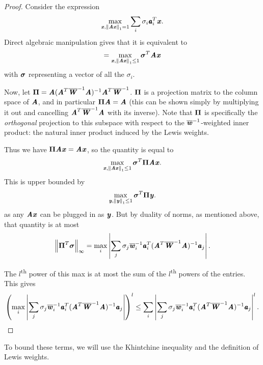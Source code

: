 \begin{proof}

Consider the expression
\begin{equation*}
\max_{\xx, \norm{\AA \xx}_1 = 1 } \sum_i \sigma_i \aa_i^T \xx.
\end{equation*}
Direct algebraic manipulation gives that it is equivalent to
\begin{equation*}
= \max_{\xx, \norm{ \AA \xx}_1 \leq 1} \ssigma^T \AA \xx
\end{equation*}
with $\ssigma$ representing a vector of all the $\sigma_i$.

Now, let $\PPi = \AA ( \AA^T \WWbar^{-1} \AA )^{-1} \AA^T \WWbar^{-1}$.  $\PPi$ is a projection matrix to
the column space of $\AA$, and in particular $\PPi \AA = \AA$ (this can be shown simply by
multiplying it out and cancelling $\AA^T \WWbar^{-1} \AA$ with its inverse).  Note that $\PPi$ is
specifically the \emph{orthogonal} projection to this subspace with respect to the
$\wwbar^{-1}$-weighted inner product: the natural inner product induced by the Lewis weights.

Thus we have $\PPi \AA \xx = \AA \xx$, so the quantity is equal to
\begin{equation*}
\max_{\xx, \norm{ \AA \xx}_1 \leq 1} \ssigma^T \PPi \AA \xx.
\end{equation*}
This is upper bounded by
\begin{equation*}
\max_{\yy, \norm{\yy}_1 \leq 1} \ssigma^T \PPi \yy.
\end{equation*}
as any $\AA \xx$ can be plugged in as $\yy$.  But by duality of norms, as mentioned above,
that quantity is at most
\begin{equation*}
\norm{\PPi^T \ssigma}_\infty = \max_i \left | \sum_j \sigma_j \wwbar_i^{-1} \aa_i^T ( \AA^T \WWbar^{-1} \AA )^{-1} \aa_j \right |.
\end{equation*}


The $l$\textsuperscript{th} power of this max is at most the sum of the
$l$\textsuperscript{th} powers of the entries.
This gives
\begin{equation*}
\left( \max_i \left | \sum_j \sigma_j \wwbar_i^{-1} \aa_i^T ( \AA^T \WWbar^{-1} \AA )^{-1} \aa_j \right | \right)^l
\leq \sum_i \left | \sum_j \sigma_j \wwbar_i^{-1} \aa_i^T ( \AA^T \WWbar^{-1} \AA )^{-1} \aa_j \right |^{l}.
\end{equation*}
\end{proof}

To bound these terms, we will use the Khintchine inequality and the definition of Lewis weights.

